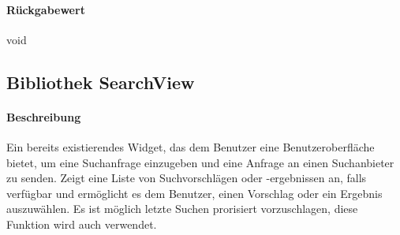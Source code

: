 \paragraph*{Rückgabewert}
void

\subsection{Bibliothek SearchView}
\paragraph*{Beschreibung}
Ein bereits existierendes Widget, das dem Benutzer eine Benutzeroberfläche bietet, um eine Suchanfrage einzugeben und eine Anfrage an einen Suchanbieter zu senden. 
Zeigt eine Liste von Suchvorschlägen oder -ergebnissen an, falls verfügbar 
und ermöglicht es dem Benutzer, einen Vorschlag oder ein Ergebnis auszuwählen.
Es ist möglich letzte Suchen prorisiert vorzuschlagen, diese Funktion wird auch verwendet.
